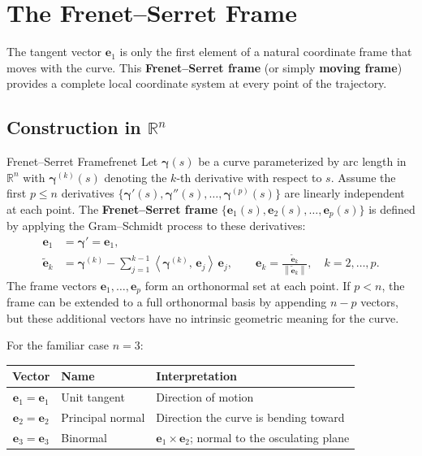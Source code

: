 \documentclass[12pt, openany]{book}
\theoremstyle{plain}
\newcommand{\traj}{\bm{\gamma}}
\newcommand{\Reals}{\mathbb{R}}
\newcommand{\norm}[1]{\left\lVert #1 \right\rVert}
\newcommand{\inner}[2]{\left\langle #1,\, #2 \right\rangle}
\newcommand{\tangent}{\bm{e}_1}
\newcommand{\normal}{\bm{e}_2}
\newcommand{\binormal}{\bm{e}_3}
\newcommand{\frenet}{\bm{e}}
\begin{document}
\section{The Frenet--Serret Frame}

The tangent vector $\tangent$ is only the first element of a natural coordinate
frame that moves with the curve. This \textbf{Frenet--Serret frame} (or simply
\textbf{moving frame}) provides a complete local coordinate system at every point
of the trajectory.

\subsection{Construction in $\Reals^n$}

\begin{definition}{Frenet--Serret Frame}{frenet}
  Let $\traj(s)$ be a curve parameterized by arc length in $\Reals^n$ with
  $\traj^{(k)}(s)$ denoting the $k$-th derivative with respect to $s$. Assume the
  first $p \leq n$ derivatives $\{\traj'(s), \traj''(s), \ldots, \traj^{(p)}(s)\}$
  are linearly independent at each point. The \textbf{Frenet--Serret frame}
  $\{\frenet_1(s), \frenet_2(s), \ldots, \frenet_p(s)\}$ is defined by
  applying the Gram--Schmidt process to these derivatives:
  \begin{align}
    \frenet_1 &= \traj' = \tangent, \label{eq:frenet_e1} \\[4pt]
    \tilde{\frenet}_k &= \traj^{(k)} - \sum_{j=1}^{k-1}
      \inner{\traj^{(k)}}{\frenet_j}\, \frenet_j, \qquad
    \frenet_k = \frac{\tilde{\frenet}_k}{\norm{\tilde{\frenet}_k}},
    \quad k = 2, \ldots, p. \label{eq:frenet_ek}
  \end{align}
  The frame vectors $\frenet_1, \ldots, \frenet_p$ form an orthonormal set at
  each point. If $p < n$, the frame can be extended to a full orthonormal basis
  by appending $n - p$ vectors, but these additional vectors have no intrinsic
  geometric meaning for the curve.
\end{definition}

For the familiar case $n = 3$:

\begin{center}
\renewcommand{\arraystretch}{1.5}
\begin{tabular}{@{} c l l @{}}
  \toprule
  \textbf{Vector} & \textbf{Name} & \textbf{Interpretation} \\
  \midrule
  $\frenet_1 = \tangent$ & Unit tangent & Direction of motion \\
  $\frenet_2 = \normal$ & Principal normal & Direction the curve is bending toward \\
  $\frenet_3 = \binormal$ & Binormal & $\tangent \times \normal$;
    normal to the osculating plane \\
  \bottomrule
\end{tabular}
\end{center}
\end{document}
